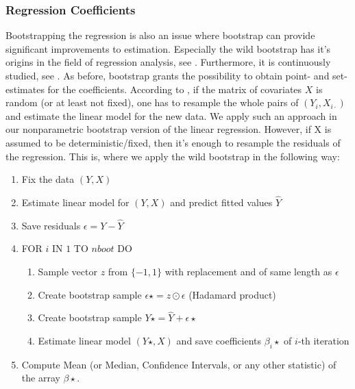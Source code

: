 	\subsubsection*{Regression Coefficients}
Bootstrapping the regression is also an issue where bootstrap can provide significant improvements to estimation. Especially the wild bootstrap has it's origins in the field of regression analysis, see \citet{wboot1}. Furthermore, it is continuously studied, see \citet{wboot2}. As before, bootstrap grants the possibility to obtain point- and set-estimates for the coefficients. According to \citet{regression}, if the matrix of covariates $X$ is random (or at least not fixed), one has to resample the whole pairs of $(Y_i, X_{i\cdot})$ and estimate the linear model for the new data. We apply such an approach in our nonparametric bootstrap version of the linear regression. However, if X is assumed to be deterministic/fixed, then it's enough to resample the residuals of the regression. This is, where we apply the wild bootstrap in the following way:
\begin{enumerate}
	\item Fix the data $(Y, X)$
	\item Estimate linear model for $(Y, X)$ and predict fitted values $\hat{Y}$
	\item Save residuals $\epsilon = Y - \hat{Y}$
	\item FOR $i$ IN $1$ TO $nboot$ DO
	\begin{enumerate}
		\item Sample vector $z$ from $\{-1,1\}$ with replacement and of same length as $\epsilon$
		\item Create bootstrap sample $\epsilon\star = z \odot \epsilon$ (Hadamard product)
		\item Create bootstrap sample $Y\star = \hat{Y} + \epsilon\star$
		\item Estimate linear model $(Y\star, X)$ and save coefficients $\beta_i\star$ of $i$-th iteration
	\end{enumerate}
	\item Compute Mean (or Median, Confidence Intervals, or any other statistic) of the array $\beta\star$.
\end{enumerate}
